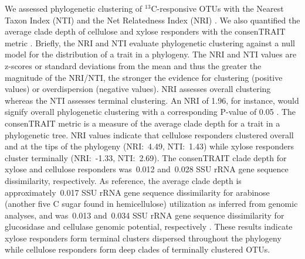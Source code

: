 We assessed phylogenetic clustering of $^{13}$C-responsive OTUs with the
Nearest Taxon Index (NTI) and the Net Relatedness Index (NRI)
\citep{Webb2000}. We also quantified the average clade depth of cellulose and
xylose responders with the consenTRAIT metric \citep{Martiny2013}. Briefly, the
NRI and NTI evaluate phylogenetic clustering against a null model for the
distribution of a trait in a phylogeny. The NRI and NTI values are z-scores or
standard deviations from the mean and thus the greater the magnitude of the
NRI/NTI, the stronger the evidence for clustering (positive values) or
overdispersion (negative values). NRI assesses overall clustering whereas the
NTI assesses terminal clustering. An NRI of 1.96, for instance, would signify
overall phylogenetic clustering with a corresponding P-value of 0.05
\citep{Evans2014a}. The consenTRAIT metric is a measure of the average clade
depth for a trait in a phylogenetic tree. NRI values indicate that cellulose
responders clustered overall and at the tips of the phylogeny (NRI:~4.49,
NTI:~1.43) while xylose responders cluster terminally (NRI:~-1.33, NTI:~2.69).
The consenTRAIT clade depth for xylose and cellulose responders was~0.012
and~0.028 SSU rRNA gene sequence dissimilarity, respectively. As reference, the
average clade depth is approximately~0.017 SSU rRNA gene sequence dissimilarity
for arabinose (another five C sugar found in hemicellulose) utilization as
inferred from genomic analyses, and was~0.013 and~0.034 SSU rRNA gene sequence
dissimilarity for glucosidase and cellulase genomic potential, respectively
\citep{Martiny2013,Berlemont2013}. These results indicate xylose responders
form terminal clusters dispersed throughout the phylogeny while cellulose
responders form deep clades of terminally clustered OTUs.
